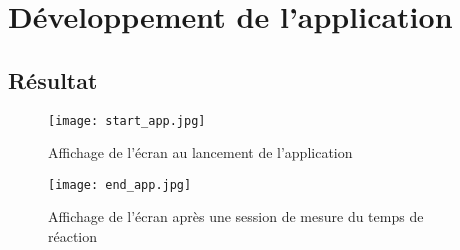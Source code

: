 \section{Développement de l'application}

\subsection{Résultat}

\begin{figure}[h]
    \centering
    \texttt{[image: start\_app.jpg]}
    \caption{Affichage de l'écran au lancement de l'application}
    \label{fig:start_app}
\end{figure}

\begin{figure}[h]
    \centering
    \texttt{[image: end\_app.jpg]}
    \caption{Affichage de l'écran après une session de mesure du temps de réaction}
    \label{fig:end_app}
\end{figure}